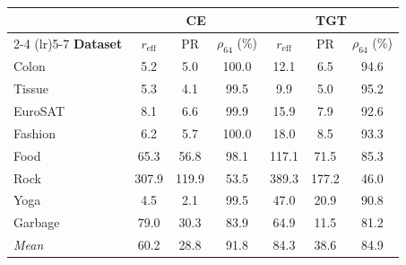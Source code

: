 \begin{tabular}{@{}lcccccc@{}}
  \toprule
  & \multicolumn{3}{c}{\textbf{CE}} & \multicolumn{3}{c}{\textbf{TGT}} \\
  \cmidrule(lr){2-4} \cmidrule(lr){5-7}
  \textbf{Dataset} & $r_{\mathrm{eff}}$ & PR & $\rho_{64}$ (\%)                   & $r_{\mathrm{eff}}$ & PR & $\rho_{64}$ (\%) \\
  \midrule
  Colon    &    5.2 &    5.0 & 100.0 &   12.1 &    6.5 &  94.6 \\
  Tissue   &    5.3 &    4.1 &  99.5 &    9.9 &    5.0 &  95.2 \\
  EuroSAT  &    8.1 &    6.6 &  99.9 &   15.9 &    7.9 &  92.6 \\
  Fashion  &    6.2 &    5.7 & 100.0 &   18.0 &    8.5 &  93.3 \\
  Food     &   65.3 &   56.8 &  98.1 &  117.1 &   71.5 &  85.3 \\
  Rock     &  307.9 &  119.9 &  53.5 &  389.3 &  177.2 &  46.0 \\
  Yoga     &    4.5 &    2.1 &  99.5 &   47.0 &   20.9 &  90.8 \\
  Garbage  &   79.0 &   30.3 &  83.9 &   64.9 &   11.5 &  81.2 \\
  \midrule
  \textit{Mean} &   60.2 &   28.8 &  91.8 &   84.3 &   38.6 &  84.9 \\
  \bottomrule
\end{tabular}
